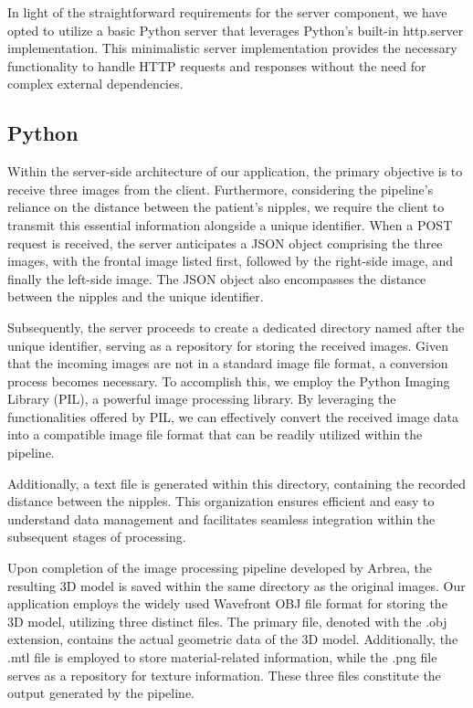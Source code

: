 In light of the straightforward requirements for the server component, we have opted to utilize a basic Python server that leverages Python's built-in http.server implementation. 
This minimalistic server implementation provides the necessary functionality to handle HTTP requests and responses without the need for complex external dependencies.

\subsection{Python}

Within the server-side architecture of our application, the primary objective is to receive three images from the client. Furthermore, considering the pipeline's reliance on the distance 
between the patient's nipples, we require the client to transmit this essential information alongside a unique identifier. When a POST request is received, the server anticipates a JSON object 
comprising the three images, with the frontal image listed first, followed by the right-side image, and finally the left-side image. The JSON object also encompasses the distance 
between the nipples and the unique identifier.

Subsequently, the server proceeds to create a dedicated directory named after the unique identifier, serving as a repository for storing the received images. Given that the incoming 
images are not in a standard image file format, a conversion process becomes necessary. To accomplish this, we employ the Python Imaging Library (PIL), a powerful image processing library. 
By leveraging the functionalities offered by PIL, we can effectively convert the received image data into a compatible image file format that can be readily utilized within the pipeline. 

Additionally, a text file is generated within this directory, containing the recorded distance between the nipples. 
This organization ensures efficient and easy to understand data management and facilitates seamless integration within the subsequent stages of processing.

Upon completion of the image processing pipeline developed by Arbrea, the resulting 3D model is saved within the same directory as the original images. 
Our application employs the widely used Wavefront OBJ file format for storing the 3D model, utilizing three distinct files. The primary file, 
denoted with the .obj extension, contains the actual geometric data of the 3D model. Additionally, the .mtl file is employed to store material-related information, 
while the .png file serves as a repository for texture information. These three files constitute the output generated by the pipeline.


